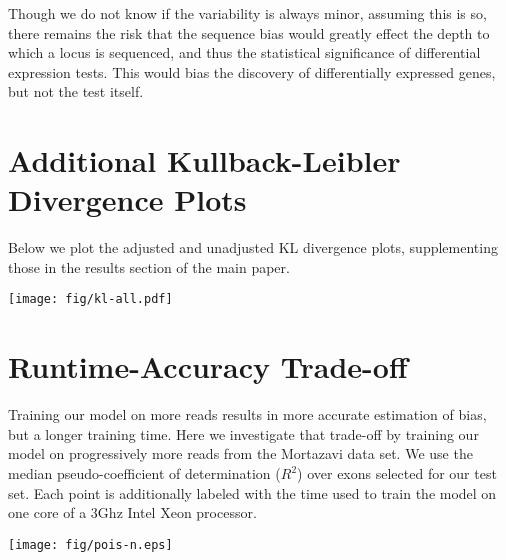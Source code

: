 \documentclass[letterpaper]{article}
\begin{document}
Though we do not know if the variability is always minor, assuming this is so,
there remains the risk that the sequence bias would greatly effect the depth to
which a locus is sequenced, and thus the statistical significance of
differential expression tests. This would bias the discovery of differentially
expressed genes, but not the test itself.



\section{Additional Kullback-Leibler Divergence Plots}

Below we plot the adjusted and unadjusted KL divergence plots, supplementing
those in the results section of the main paper.


\texttt{[image: fig/kl-all.pdf]}


\section{Runtime-Accuracy Trade-off}

Training our model on more reads results in more accurate estimation of bias,
but a longer training time. Here we investigate that trade-off by training our
model on progressively more reads from the Mortazavi data set. We use the
median pseudo-coefficient of determination ($R^2$) over exons selected for our
test set. Each point is additionally labeled with the time used to train the
model on one core of a 3Ghz Intel Xeon processor.

\texttt{[image: fig/pois-n.eps]}




\end{document}
